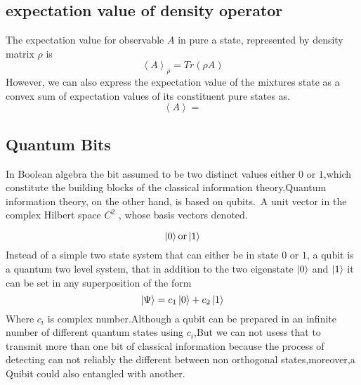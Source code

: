 \subsection{expectation value of density operator}

The expectation value for observable $A$ in pure a state, represented  by density matrix $\rho$ is
$$\left<A\right>_\rho=Tr(\rho A)$$
However, we can  also express the expectation value of the mixtures state as a convex sum of expectation values of its constituent pure states as.
$$\left<A\right>=$$


\subsection{Quantum Bits}

In Boolean algebra the bit assumed to be  two distinct values either $0 $ or $1$,which constitute the building blocks of the classical information theory,Quantum information theory, on the other hand, is based on qubits.\citep{nielsen2002quantum}~A unit vector in the  complex Hilbert space $C^2$ , whose basis vectors denoted.

\begin{equation}
\ket{0}\text{or}\ket{1}
\end{equation}
Instead of a simple two state system that can either be in state $0$ or $1$, a qubit is a quantum two level system, that in addition to the two eigenstate $\ket{0}$ and $\ket{1}$ it can be set in any superposition of the form
$$\ket{\Psi}=c_1\ket{0}+c_2\ket{1}$$
Where $c_i$ is complex number.Although a qubit can be prepared in an infinite number of different quantum states using $c_i$,But we can  not usess that to transmit more than one bit of classical information because the process of detecting can not reliably the different between non orthogonal states,moreover,a Quibit could also entangled with another.
